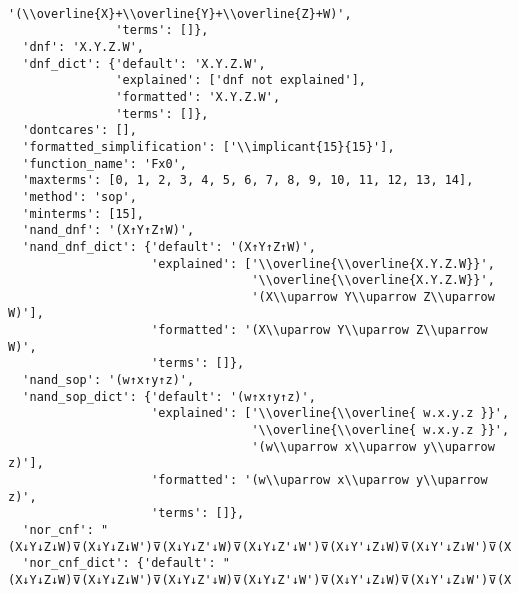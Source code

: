 \begin{verbatim}
                            '(\\overline{X}+\\overline{Y}+\\overline{Z}+W)',
               'terms': []},
  'dnf': 'X.Y.Z.W',
  'dnf_dict': {'default': 'X.Y.Z.W',
               'explained': ['dnf not explained'],
               'formatted': 'X.Y.Z.W',
               'terms': []},
  'dontcares': [],
  'formatted_simplification': ['\\implicant{15}{15}'],
  'function_name': 'Fx0',
  'maxterms': [0, 1, 2, 3, 4, 5, 6, 7, 8, 9, 10, 11, 12, 13, 14],
  'method': 'sop',
  'minterms': [15],
  'nand_dnf': '(X↑Y↑Z↑W)',
  'nand_dnf_dict': {'default': '(X↑Y↑Z↑W)',
                    'explained': ['\\overline{\\overline{X.Y.Z.W}}',
                                  '\\overline{\\overline{X.Y.Z.W}}',
                                  '(X\\uparrow Y\\uparrow Z\\uparrow W)'],
                    'formatted': '(X\\uparrow Y\\uparrow Z\\uparrow W)',
                    'terms': []},
  'nand_sop': '(w↑x↑y↑z)',
  'nand_sop_dict': {'default': '(w↑x↑y↑z)',
                    'explained': ['\\overline{\\overline{ w.x.y.z }}',
                                  '\\overline{\\overline{ w.x.y.z }}',
                                  '(w\\uparrow x\\uparrow y\\uparrow z)'],
                    'formatted': '(w\\uparrow x\\uparrow y\\uparrow z)',
                    'terms': []},
  'nor_cnf': "(X↓Y↓Z↓W)⊽(X↓Y↓Z↓W')⊽(X↓Y↓Z'↓W)⊽(X↓Y↓Z'↓W')⊽(X↓Y'↓Z↓W)⊽(X↓Y'↓Z↓W')⊽(X↓Y'↓Z'↓W)⊽(X↓Y'↓Z'↓W')⊽(X'↓Y↓Z↓W)⊽(X'↓Y↓Z↓W')⊽(X'↓Y↓Z'↓W)⊽(X'↓Y↓Z'↓W')⊽(X'↓Y'↓Z↓W)⊽(X'↓Y'↓Z↓W')⊽(X'↓Y'↓Z'↓W)",
  'nor_cnf_dict': {'default': "(X↓Y↓Z↓W)⊽(X↓Y↓Z↓W')⊽(X↓Y↓Z'↓W)⊽(X↓Y↓Z'↓W')⊽(X↓Y'↓Z↓W)⊽(X↓Y'↓Z↓W')⊽(X↓Y'↓Z'↓W)⊽(X↓Y'↓Z'↓W')⊽(X'↓Y↓Z↓W)⊽(X'↓Y↓Z↓W')⊽(X'↓Y↓Z'↓W)⊽(X'↓Y↓Z'↓W')⊽(X'↓Y'↓Z↓W)⊽(X'↓Y'↓Z↓W')⊽(X'↓Y'↓Z'↓W)",

\end{verbatim}
